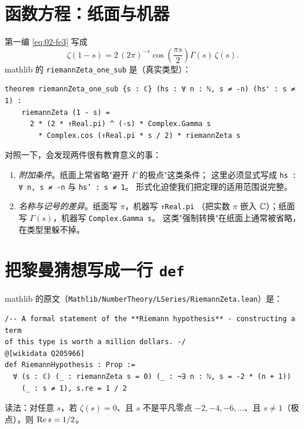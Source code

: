 \section{函数方程：纸面与机器}
\label{sec:08-fe}

第一编 \cref{eq:02-fe3} 写成
\[
  \zeta(1-s)=2\,(2\pi)^{-s}\cos\!\left(\frac{\pi s}{2}\right)\Gamma(s)\,\zeta(s).
\]
mathlib 的 \texttt{riemannZeta\_one\_sub} 是（真实类型）：

\begin{lstlisting}[language=Lean,numbers=none,frame=none,xleftmargin=0pt]
theorem riemannZeta_one_sub {s : ℂ} (hs : ∀ n : ℕ, s ≠ -n) (hs' : s ≠ 1) :
    riemannZeta (1 - s) =
      2 * (2 * ↑Real.pi) ^ (-s) * Complex.Gamma s
        * Complex.cos (↑Real.pi * s / 2) * riemannZeta s
\end{lstlisting}

对照一下，会发现两件很有教育意义的事：

\begin{enumerate}[label=\arabic*.]
  \item \emph{附加条件}。纸面上常省略"避开 $\Gamma$ 的极点"这类条件；
        这里必须显式写成 \texttt{hs : ∀ n, s ≠ -n} 与 \texttt{hs' : s ≠ 1}。
        形式化迫使我们把定理的适用范围说完整。
  \item \emph{名称与记号的差异}。纸面写 $\pi$，机器写 \texttt{↑Real.pi}
        （把实数 $\pi$ 嵌入 $\mathbb{C}$）；纸面写 $\Gamma(s)$，机器写 \texttt{Complex.Gamma s}。
        这类"强制转换"在纸面上通常被省略，在类型里躲不掉。
\end{enumerate}

\section{把黎曼猜想写成一行 \texttt{def}}
\label{sec:08-rh}

mathlib 的原文（\texttt{Mathlib/NumberTheory/LSeries/RiemannZeta.lean}）是：

\begin{lstlisting}[language=Lean,numbers=none,frame=none,xleftmargin=0pt]
/-- A formal statement of the **Riemann hypothesis** - constructing a term
of this type is worth a million dollars. -/
@[wikidata Q205966]
def RiemannHypothesis : Prop :=
  ∀ (s : ℂ) (_ : riemannZeta s = 0) (_ : ¬∃ n : ℕ, s = -2 * (n + 1))
    (_ : s ≠ 1), s.re = 1 / 2
\end{lstlisting}

读法：对任意 $s$，若 $\zeta(s)=0$、且 $s$ 不是平凡零点
$-2,-4,-6,\dots$、且 $s\ne1$（极点），则 $\operatorname{Re} s=1/2$。

